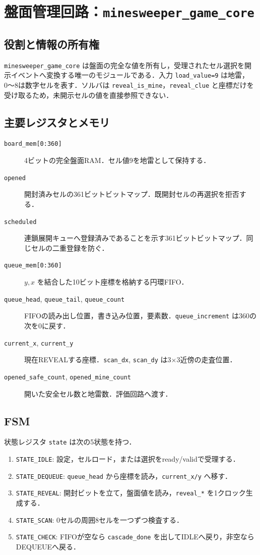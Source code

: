 \chapter{盤面管理回路：\texttt{minesweeper\_game\_core}}
\label{ch:game-core}

\section{役割と情報の所有権}
\texttt{minesweeper\_game\_core} は盤面の完全な値を所有し，受理されたセル選択を開示イベントへ変換する唯一のモジュールである．入力 \texttt{load\_value=9} は地雷，0〜8は数字セルを表す．ソルバは \texttt{reveal\_is\_mine}，\texttt{reveal\_clue} と座標だけを受け取るため，未開示セルの値を直接参照できない．

\section{主要レジスタとメモリ}
\begin{description}
  \item[\texttt{board\_mem[0:360]}] 4ビットの完全盤面RAM．セル値9を地雷として保持する．
  \item[\texttt{opened}] 開封済みセルの361ビットビットマップ．既開封セルの再選択を拒否する．
  \item[\texttt{scheduled}] 連鎖展開キューへ登録済みであることを示す361ビットビットマップ．同じセルの二重登録を防ぐ．
  \item[\texttt{queue\_mem[0:360]}] \(y,x\) を結合した10ビット座標を格納する円環FIFO．
  \item[\texttt{queue\_head}, \texttt{queue\_tail}, \texttt{queue\_count}] FIFOの読み出し位置，書き込み位置，要素数．\texttt{queue\_increment} は360の次を0に戻す．
  \item[\texttt{current\_x}, \texttt{current\_y}] 現在REVEALする座標．\texttt{scan\_dx}, \texttt{scan\_dy} は3\(\times\)3近傍の走査位置．
  \item[\texttt{opened\_safe\_count}, \texttt{opened\_mine\_count}] 開いた安全セル数と地雷数．評価回路へ渡す．
\end{description}

\section{FSM}
状態レジスタ \texttt{state} は次の5状態を持つ．
\begin{enumerate}
  \item \texttt{STATE\_IDLE}: 設定，セルロード，または選択をready/validで受理する．
  \item \texttt{STATE\_DEQUEUE}: \texttt{queue\_head} から座標を読み，\texttt{current\_x/y} へ移す．
  \item \texttt{STATE\_REVEAL}: 開封ビットを立て，盤面値を読み，\texttt{reveal\_*} を1クロック生成する．
  \item \texttt{STATE\_SCAN}: 0セルの周囲8セルを一つずつ検査する．
  \item \texttt{STATE\_CHECK}: FIFOが空なら \texttt{cascade\_done} を出してIDLEへ戻り，非空ならDEQUEUEへ戻る．
\end{enumerate}

